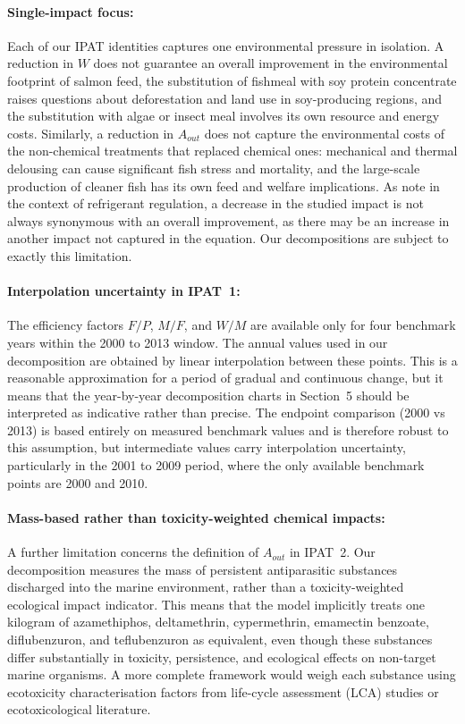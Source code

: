 \documentclass[12pt, a4paper]{report}
\begin{document}
\paragraph{Single-impact focus:}
Each of our IPAT identities captures one environmental pressure in
isolation. A reduction in $W$ does not guarantee an overall improvement
in the environmental footprint of salmon feed, the substitution of
fishmeal with soy protein concentrate raises questions about
deforestation and land use in soy-producing regions, and the substitution
with algae or insect meal involves its own resource and energy costs.
Similarly, a reduction in $A_{out}$ does not capture the environmental
costs of the non-chemical treatments that replaced chemical ones:
mechanical and thermal delousing can cause significant fish stress and
mortality, and the large-scale production of cleaner fish has its own
feed and welfare implications. As \citet{coolchoices2024} note in the
context of refrigerant regulation, a decrease in the studied impact is
not always synonymous with an overall improvement, as there may be an
increase in another impact not captured in the equation. Our
decompositions are subject to exactly this limitation.

\paragraph{Interpolation uncertainty in IPAT~1:}
The efficiency factors $F/P$, $M/F$, and $W/M$ are available only for
four benchmark years within the 2000 to 2013 window. The annual values
used in our decomposition are obtained by linear interpolation between
these points. This is a reasonable approximation for a period of
gradual and continuous change, but it means that the year-by-year
decomposition charts in Section~5 should be interpreted as indicative
rather than precise. The endpoint comparison (2000 vs 2013) is based
entirely on measured benchmark values and is therefore robust to this
assumption, but intermediate values carry interpolation uncertainty,
particularly in the 2001 to 2009 period, where the only available benchmark
points are 2000 and 2010.

\paragraph{Mass-based rather than toxicity-weighted chemical impacts:}

A further limitation concerns the definition of $A_{out}$ in IPAT~2.
Our decomposition measures the mass of persistent antiparasitic
substances discharged into the marine environment, rather than a
toxicity-weighted ecological impact indicator. This means that the
model implicitly treats one kilogram of azamethiphos, deltamethrin,
cypermethrin, emamectin benzoate, diflubenzuron, and teflubenzuron
as equivalent, even though these substances differ substantially in
toxicity, persistence, and ecological effects on non-target marine
organisms. A more complete framework would weigh each substance using
ecotoxicity characterisation factors from life-cycle assessment (LCA)
studies or ecotoxicological literature.
\end{document}
